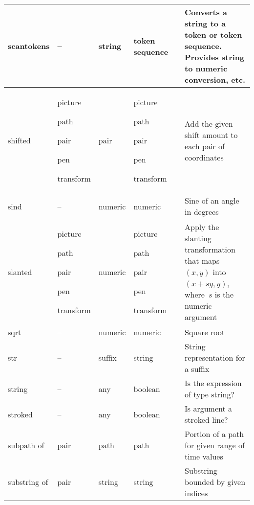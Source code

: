 \begin{longtable}{|>{\raggedright{}\ttfamily}p{.793in}*{3}{|>{\raggedright}p{.715in}}|>{\raggedleft}p{1.5em}|>{\raggedright\arraybackslash}X|}
scantokens&  --&  string&  token sequence&  \pageref{Dscantokens}&  Converts a string to a token or token sequence. Provides string to numeric conversion, etc.\\\hline
shifted&  picture\par path\par pair\par pen\par transform&  pair&  picture\par path\par pair\par pen\par transform&  \pageref{Dtranop}&  Add the given shift amount to each pair of coordinates\\\hline
sind&  --&  numeric&  numeric&  \pageref{Dsind}&  Sine of an angle in degrees\\\hline
slanted&  picture\par path\par pair\par pen\par transform&  numeric&  picture\par path\par pair\par pen\par transform&  \pageref{Dtranop}&  Apply the slanting transformation that maps $(x,y)$ into $(x+sy,y)$, where~$s$ is the numeric argument\\\hline
sqrt&  --&  numeric&  numeric&  \pageref{Dsqrt}&  Square root\\\hline
str&  --&  suffix&  string&  \pageref{Dstr}&  String representation for a suffix\\\hline
string&  --&  any&  boolean&  \pageref{Dstrgop}&  Is the expression of type string?\\\hline
stroked&  --&  any&  boolean&  \pageref{Dstroked}&  Is argument a stroked line?\\\hline
subpath of&  pair&  path&  path&  \pageref{Dsubpth}&  Portion of a path for given range of time values\\\hline
substring of&  pair&  string&  string&  \pageref{Dsubstr}&  Substring bounded by given indices\\\hline

\end{longtable}
